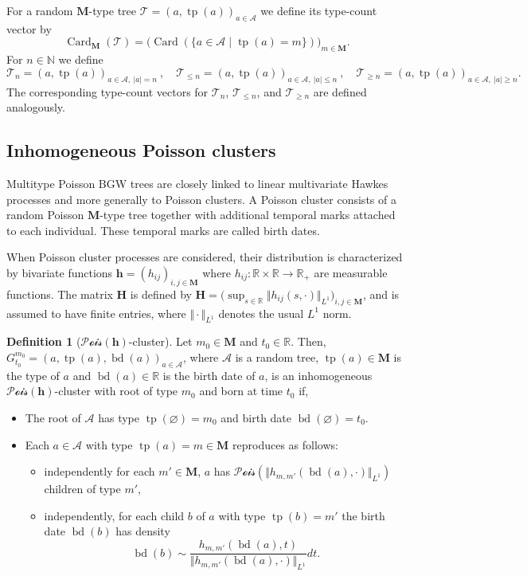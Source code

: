 \documentclass[reqno,final,11pt]{amsart}
\theoremstyle{plain}
\theoremstyle{definition}
\newtheorem{definition}[theorem]{Definition}
\theoremstyle{remark}
\newcommand{\R}{\mathds{R}}
\newcommand{\N}{\mathds{N}}
\newcommand{\M}{\bm{M}}
\newcommand{\T}{\mathcal{T}}
\newcommand{\A}{\mathcal{A}}
\newcommand{\h}{\bm{h}}
\renewcommand{\H}{\bm{H}}
\newcommand{\Vone}[1]{\Vert #1 \Vert_{L^1}}
\newcommand{\Pois}{\mathscr{P}\!\mathscr{o}\!\mathscr{i}\!\mathscr{s}}
\DeclareMathOperator{\card}{Card}
\DeclareMathOperator{\tp}{tp}
\DeclareMathOperator{\bd}{bd}
\begin{document}
For a random $\M$-type tree $\T = (a,\tp(a))_{a\in\A}$ we define its type-count vector by
\begin{equation*}
    \card_{\M}(\T) = \big( \card(\{a\in\A \mid \tp(a)=m \})\big)_{m\in\M}.
\end{equation*}
For $n\in\N$ we define
\begin{equation*}
    \T_n = (a,\tp(a))_{a\in\A, \ \vert a \vert = n} \ , \quad \T_{\leq n} = (a,\tp(a))_{a\in\A, \ \vert a \vert \leq n} \ , \quad \T_{\geq n} = (a,\tp(a))_{a\in\A, \ \vert a \vert \geq n}.
\end{equation*}
The corresponding type-count vectors for $\T_n$, $\T_{\leq n}$, and $\T_{\geq n}$
are defined analogously.

\subsection{Inhomogeneous Poisson clusters}

Multitype Poisson BGW trees are closely linked to linear multivariate Hawkes processes and more generally to Poisson clusters. A Poisson cluster consists of a random Poisson $\M$-type tree together with additional temporal marks attached to each individual. These temporal marks are called birth dates.

When Poisson cluster processes are considered, their distribution is characterized by bivariate functions $\h = (h_{ij})_{i,j\in\M}$ where $h_{ij} : \R\times \R \longrightarrow \R_+$ are measurable functions. The matrix $\H$ is defined by $\H= \big(\sup_{s\in\R} \Vone{h_{ij}(s,\cdot)}\big)_{i,j\in\M}$, and is assumed to have finite entries, where $\Vone{\cdot}$ denotes the usual $L^1$ norm. 

\begin{definition}[$\Pois(\h)$-cluster]
	Let $m_0\in\M$ and $t_0\in\R$. Then, $G^{m_0}_{t_0}=(a,\tp(a),\bd(a))_{a\in\A}$, where $\A$ is a random tree, $\tp(a)\in\M$ is the type of $a$ and $\bd(a)\in\R$ is the birth date of $a$, is an inhomogeneous $\Pois(\h)$-cluster with root of type $m_0$ and born at time $t_0$ if,
\begin{itemize}
    \item The root of $\A$ has type $\tp(\varnothing)=m_0$ and birth date $\bd(\varnothing) = t_0$.
    \item Each $a\in\A$ with type $\tp(a)=m\in\M$ reproduces as follows:
    \begin{itemize}
        \item independently for each $m'\in\M$, $a$ has $\Pois(\Vone{ h_{m,m'}(\bd(a),\cdot)})$ children of type $m'$,
        \item independently, for each child $b$ of $a$ with type $\tp(b)=m'$ the birth date $\bd(b)$ has density
        \[ \bd(b) \sim \frac{h_{m,m'}(\bd(a),t)}{\Vone{h_{m,m'}(\bd(a),\cdot)}} dt.\]
    \end{itemize}
\end{itemize}
\end{definition}
\end{document}
